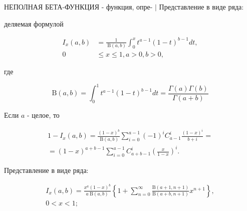 \documentclass[10pt]{article}
\begin{document}
НЕПОЛНАЯ БЕТА-ФУНКЦИЯ - функция, опре- $\mid$ Представление в виде ряда:



деляемая формулой



\[

\begin{aligned}

I_{x}(a, b) & =\frac{1}{\mathrm{~B}(a, b)} \int_{0}^{x} t^{a-1}(1-t)^{b-1} d t, \\

0 & \leqslant x \leqslant 1, a>0, b>0,

\end{aligned}

\]



где



\[

\mathrm{B}(a, b)=\int_{0}^{1} t^{a-1}(1-t)^{b-1} d t=\frac{\Gamma(a) \Gamma(b)}{\Gamma(a+b)}

\]



Если $a$ - целое, то



\[

\begin{gathered}

1-I_{x}(a, b)=\frac{(1-x)^{b}}{\mathrm{~B}(a, b)} \sum_{i=0}^{a-1}(-1)^{i} C_{a-1}^{i} \frac{(1-x)^{i}}{b+i}= \\

=(1-x)^{a+b-1} \sum_{i=0}^{a-1} C_{a+b-1}^{i}\left(\frac{x}{1-x}\right)^{i} .

\end{gathered}

\]



Представление в виде ряда:



\[

\begin{gathered}

I_{x}(a, b)=\frac{x^{a}(1-x)^{b}}{a \mathrm{~B}(a, b)}\left\{1+\sum_{n=0}^{\infty} \frac{\mathrm{B}(a+1, n+1)}{\mathrm{B}(a+b, n+1)} x^{n+1}\right\}, \\

0<x<1 ;

\end{gathered}

\]
\end{document}
